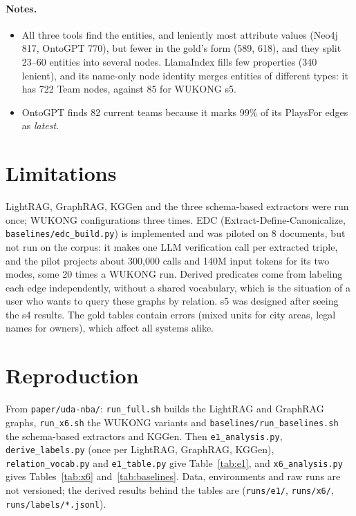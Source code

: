 \documentclass[11pt]{article}
\newcommand{\code}[1]{\texttt{#1}}
\newcommand{\wk}{WUKONG}
\begin{document}
\paragraph{Notes.}
\begin{itemize}
  \item All three tools find the entities, and leniently most attribute values (Neo4j 817, OntoGPT 770),
    but fewer in the gold's form (589, 618), and they split 23--60 entities into several nodes.
    LlamaIndex fills few properties (340 lenient), and its name-only node identity merges entities
    of different types: it has 722 Team nodes, against 85 for \wk{} s5.
  \item OntoGPT finds 82 current teams because it marks 99\% of its PlaysFor edges as \emph{latest}.
\end{itemize}

\section{Limitations}

LightRAG, GraphRAG, KGGen and the three schema-based extractors were run once; \wk{} configurations
three times. EDC (Extract-Define-Canonicalize, \code{baselines/edc\_build.py}) is implemented and was
piloted on 8 documents, but not run on the corpus: it makes one LLM verification call per extracted
triple, and the pilot projects about 300,000 calls and 140M input tokens for its two modes, some 20
times a \wk{} run. Derived predicates come from labeling each edge independently, without a shared vocabulary,
which is the situation of a user who wants to query these graphs by relation. s5 was designed
after seeing the s4 results. The gold tables contain errors (mixed units for city areas, legal names
for owners), which affect all systems alike.

\section*{Reproduction}

From \code{paper/uda-nba/}: \code{run\_full.sh} builds the LightRAG and GraphRAG graphs,
\code{run\_x6.sh} the \wk{} variants and \code{baselines/run\_baselines.sh} the schema-based
extractors and KGGen. Then \code{e1\_analysis.py}, \code{derive\_labels.py} (once per LightRAG, GraphRAG, KGGen),
\code{relation\_vocab.py} and \code{e1\_table.py} give Table~\ref{tab:e1}, and
\code{x6\_analysis.py} gives Tables~\ref{tab:x6} and~\ref{tab:baselines}. Data, environments and
raw runs are not versioned; the derived results behind the tables are (\code{runs/e1/},
\code{runs/x6/}, \code{runs/labels/*.jsonl}).
\end{document}
